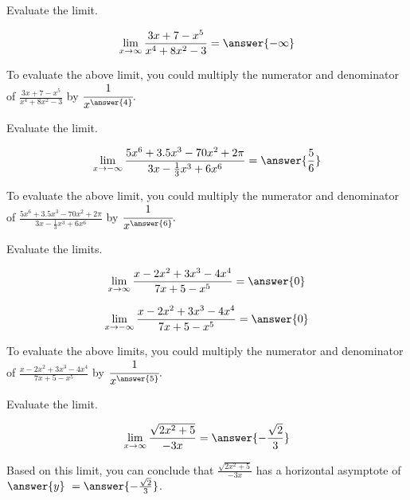 \documentclass[handout]{ximera}
\begin{document}
\begin{exercise}

Evaluate the limit. 

\[ \displaystyle\lim_{x \to \infty} \frac{3x +7 - x^5}{x^4 + 8x^2 -3} = \answer{-\infty} \]

\begin{exercise}

To evaluate the above limit, you could multiply the numerator and denominator of $\frac{3x +7 - x^5}{x^4 + 8x^2 -3}$ by $\cfrac{1}{x^{\answer{4}}}.$

\end{exercise}

\end{exercise}

\begin{exercise}

Evaluate the limit. 

\[ \displaystyle\lim_{x \to -\infty} \frac{5x^6 + 3.5x^3 -70x^2 + 2\pi}{3x - \frac{1}{3}x^3+ 6x^6} = \answer{\frac{5}{6}} \]

\begin{exercise}

To evaluate the above limit, you could multiply the numerator and denominator of $\frac{5x^6 + 3.5x^3 -70x^2 + 2\pi}{3x - \frac{1}{3}x^3+ 6x^6}$ by $\cfrac{1}{x^{\answer{6}}}.$

\end{exercise}

\end{exercise}

\begin{exercise}

Evaluate the limits. 

\[ \displaystyle\lim_{x \to \infty} \frac{x - 2x^2 + 3x^3 -4x^4}{7x+5-x^5} = \answer{0} \]

\[ \displaystyle\lim_{x \to -\infty} \frac{x - 2x^2 + 3x^3 -4x^4}{7x+5-x^5} = \answer{0} \]

\begin{exercise}

To evaluate the above limits, you could multiply the numerator and denominator of $\frac{x - 2x^2 + 3x^3 -4x^4}{7x+5-x^5}$ by $\cfrac{1}{x^{\answer{5}}}.$

\end{exercise}

\end{exercise}

\begin{exercise}

Evaluate the limit. 

\[ \displaystyle\lim_{x \to \infty} \frac{\sqrt{2x^2+5}}{-3x} = \answer{-\frac{\sqrt{2}}{3}} \]

\begin{exercise}

Based on this limit, you can conclude that $\frac{\sqrt{2x^2+5}}{-3x}$ has a horizontal asymptote of $\answer{y} \ = \answer{-\frac{\sqrt{2}}{3}}$.

\end{exercise}

\end{exercise}
\end{document}
